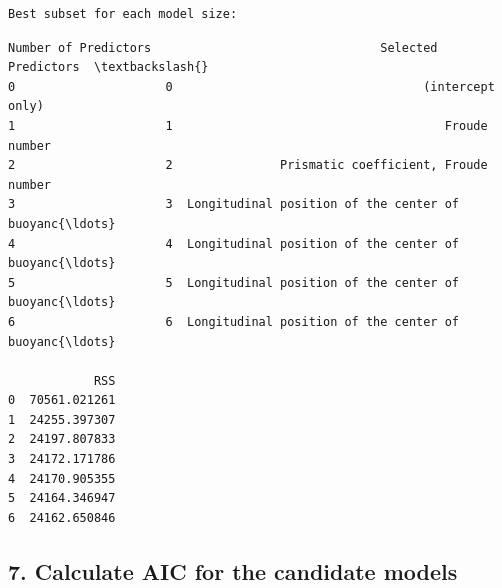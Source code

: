 \documentclass[1pt]{article}
\begin{document}
    \begin{Verbatim}[commandchars=\\\{\}]
Best subset for each model size:
    \end{Verbatim}


    \begin{Verbatim}[commandchars=\\\{\}]
   Number of Predictors                                Selected Predictors  \textbackslash{}
0                     0                                   (intercept only)   
1                     1                                      Froude number   
2                     2               Prismatic coefficient, Froude number   
3                     3  Longitudinal position of the center of buoyanc{\ldots}   
4                     4  Longitudinal position of the center of buoyanc{\ldots}   
5                     5  Longitudinal position of the center of buoyanc{\ldots}   
6                     6  Longitudinal position of the center of buoyanc{\ldots}   

            RSS  
0  70561.021261  
1  24255.397307  
2  24197.807833  
3  24172.171786  
4  24170.905355  
5  24164.346947  
6  24162.650846
    \end{Verbatim}


    \hypertarget{calculate-aic-for-the-candidate-models}{%
        \subsection{7. Calculate AIC for the candidate
        models}\label{calculate-aic-for-the-candidate-models}}
\end{document}
